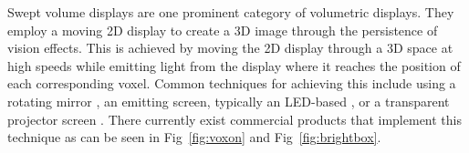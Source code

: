 \begin{invisBox}
  
	\hfill
\end{invisBox}  

Swept volume displays are one prominent category of volumetric displays. They employ a moving 2D display to create a 3D image through the persistence of vision effects. This is achieved by moving the 2D display through a 3D space at high speeds while emitting light from the display where it reaches the position of each corresponding voxel. Common techniques for achieving this include using a rotating mirror \cite{10.1117/12.480930}, an emitting screen, typically an LED-based \cite{Gately:11}, or a transparent projector screen \cite{keane_volumetric_2016}. There currently exist commercial products that implement this technique as can be seen in Fig~\ref{fig:voxon} and Fig~\ref{fig:brightbox}.



